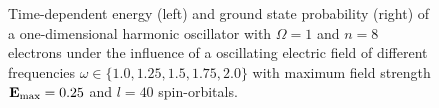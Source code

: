 \begin{figure}[!h]
    \centering
    \caption{Time-dependent energy (left) and ground state probability (right)
        of a one-dimensional harmonic oscillator with $\Omega=1$
        and $n=8$ electrons under the influence of a oscillating electric field 
        of different frequencies $\omega\in\{1.0, 1.25, 1.5, 1.75, 2.0\}$ with 
        maximum field strength $\vb{E}_\text{max}=0.25$ and $l=40$ 
        spin-orbitals.
    }
    \label{fig:1d_n10_qd_resonance}
\end{figure}


